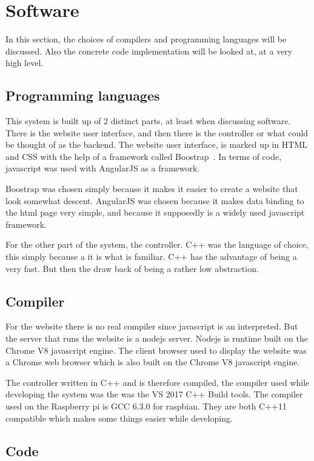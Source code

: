 \section{Software}
In this section, the choices of compilers and programming languages will be discussed. Also the concrete code implementation will be looked at, at a very high level.

\subsection{Programming languages}
This system is built up of 2 distinct parts, at least when discussing software. There is the website user interface, and then there is the controller or what could be thought of as the backend. The website user interface, is marked up in HTML and CSS with the help of a framework called Boostrap~\cite{bootstrap}. In terms of code, javascript was used with AngularJS as a framework. 

Boostrap was chosen simply because it makes it easier to create a website that look somewhat descent. AngularJS was chosen because it makes data binding to the html page very simple, and because it supposedly is a widely used javascript framework.

For the other part of the system, the controller. C++ was the language of choice, this simply because a it is what is familiar. C++ has the advantage of being a very fast. But then the draw back of being a rather low abstraction. 
 
\subsection{Compiler}
For the website there is no real compiler since javascript is an interpreted. But the server that runs the website is a nodejs server. Nodejs is runtime built on the Chrome V8 javascript engine. The client browser used to display the website was a Chrome web browser which is also built on the Chrome V8 javascript engine. 

The controller written in C++ and is therefore compiled, the compiler used while developing the system was the was the VS 2017 C++ Build tools. The compiler used on the Raspberry pi is GCC 6.3.0 for raspbian. They are both C++11 compatible which makes some things easier while developing. 

\subsection{Code}

